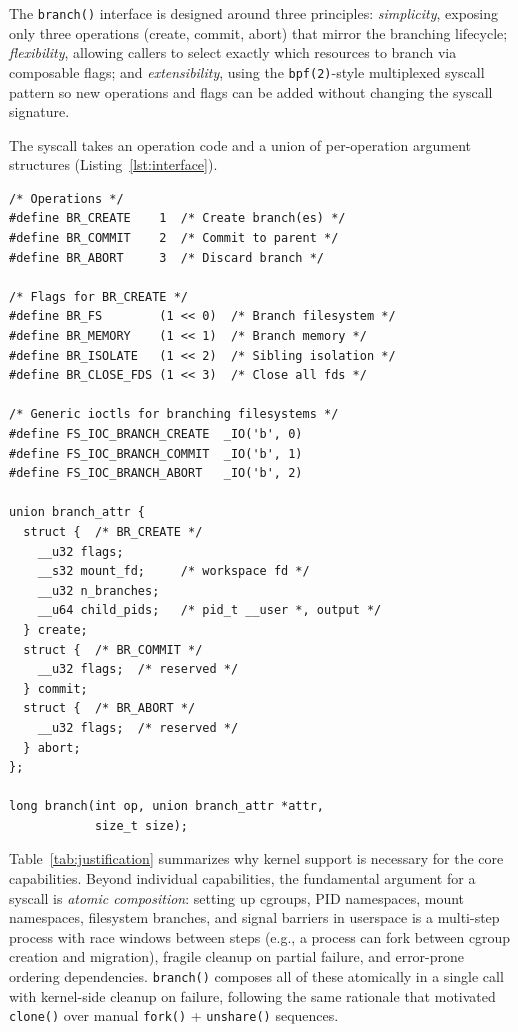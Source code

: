 \documentclass[sigconf]{acmart}
\newcommand{\syscall}{\texttt{branch()}\xspace}
\begin{document}
The \syscall interface is designed around three principles: \emph{simplicity}, exposing only three operations (create, commit, abort) that mirror the branching lifecycle; \emph{flexibility}, allowing callers to select exactly which resources to branch via composable flags; and \emph{extensibility}, using the \texttt{bpf(2)}-style multiplexed syscall pattern so new operations and flags can be added without changing the syscall signature.

The syscall takes an operation code and a union of per-operation argument structures (Listing~\ref{lst:interface}).

\begin{lstlisting}[caption={The \texttt{branch()} syscall interface.},label={lst:interface},float=tp]
/* Operations */
#define BR_CREATE    1  /* Create branch(es) */
#define BR_COMMIT    2  /* Commit to parent */
#define BR_ABORT     3  /* Discard branch */

/* Flags for BR_CREATE */
#define BR_FS        (1 << 0)  /* Branch filesystem */
#define BR_MEMORY    (1 << 1)  /* Branch memory */
#define BR_ISOLATE   (1 << 2)  /* Sibling isolation */
#define BR_CLOSE_FDS (1 << 3)  /* Close all fds */

/* Generic ioctls for branching filesystems */
#define FS_IOC_BRANCH_CREATE  _IO('b', 0)
#define FS_IOC_BRANCH_COMMIT  _IO('b', 1)
#define FS_IOC_BRANCH_ABORT   _IO('b', 2)

union branch_attr {
  struct {  /* BR_CREATE */
    __u32 flags;
    __s32 mount_fd;     /* workspace fd */
    __u32 n_branches;
    __u64 child_pids;   /* pid_t __user *, output */
  } create;
  struct {  /* BR_COMMIT */
    __u32 flags;  /* reserved */
  } commit;
  struct {  /* BR_ABORT */
    __u32 flags;  /* reserved */
  } abort;
};

long branch(int op, union branch_attr *attr,
            size_t size);
\end{lstlisting}

Table~\ref{tab:justification} summarizes why kernel support is necessary for the core capabilities. Beyond individual capabilities, the fundamental argument for a syscall is \emph{atomic composition}: setting up cgroups, PID namespaces, mount namespaces, filesystem branches, and signal barriers in userspace is a multi-step process with race windows between steps (e.g., a process can fork between cgroup creation and migration), fragile cleanup on partial failure, and error-prone ordering dependencies. \syscall composes all of these atomically in a single call with kernel-side cleanup on failure, following the same rationale that motivated \texttt{clone()} over manual \texttt{fork()} + \texttt{unshare()} sequences.
\end{document}
